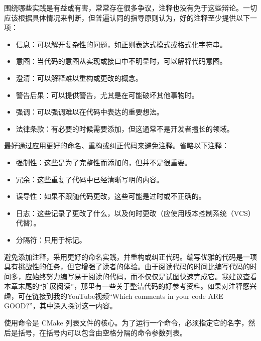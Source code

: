 围绕哪些实践是有益或有害，常常存在很多争议，注释也没有免于这些辩论。一切应该根据具体情况来判断，但普遍认同的指导原则认为，好的注释至少提供以下一项：

\begin{itemize}
\item
信息：可以解开复杂性的问题，如正则表达式模式或格式化字符串。

\item
意图：当代码的意图从实现或接口中不明显时，可以解释代码意图。

\item
澄清：可以解释难以重构或更改的概念。

\item
警告后果：可以提供警告，尤其是在可能破坏其他事物时。

\item
强调：可以强调难以在代码中表达的重要想法。

\item
法律条款：有必要的时候需要添加，但这通常不是开发者擅长的领域。
\end{itemize}

最好通过应用更好的命名、重构或纠正代码来避免注释。省略以下注释：

\begin{itemize}
\item
强制性：这些是为了完整性而添加的，但并不是很重要。

\item
冗余：这些重复了代码中已经清晰写明的内容。

\item
误导性：如果不跟随代码更改，这些可能是过时或不正确的。

\item
日志：这些记录了更改了什么，以及何时更改（应使用版本控制系统（VCS）代替）。

\item
分隔符：只用于标记。
\end{itemize}

避免添加注释，采用更好的命名实践，并重构或纠正代码。编写优雅的代码是一项具有挑战性的任务，但它增强了读者的体验。由于阅读代码的时间比编写代码的时间多，应始终努力编写易于阅读的代码，而不仅仅是试图快速完成它。我建议查看本章末尾的“扩展阅读”，那里有一些关于整洁代码的好参考资料。如果对注释感兴趣，可在链接到我的YouTube视频“Which comments in your code ARE GOOD?”，其中深入探讨这一内容。


使用命令是 CMake 列表文件的核心。为了运行一个命令，必须指定它的名字，然后是括号，在括号内可以包含由空格分隔的命令参数列表。

